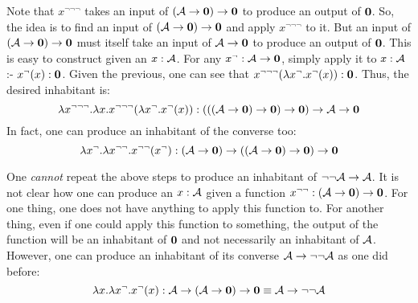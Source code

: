 Note that $x^{\neg\neg\neg}$ takes an input of $(\mathcal{A} \to \textbf{0}) \to \textbf{0}$ to produce an output of $\textbf{0}$. So, the idea is to find an input of $(\mathcal{A} \to \textbf{0}) \to \textbf{0}$ and apply $x^{\neg\neg\neg}$ to it. But an input of $(\mathcal{A} \to \textbf{0}) \to \textbf{0}$ must itself take an input of $\mathcal{A} \to \textbf{0}$ to produce an output of $\textbf{0}$. This is easy to construct given an $x : \mathcal{A}$. For any $x^{\neg} : \mathcal{A} \to \textbf{0}$, simply apply it to $x : \mathcal{A}$ :- $x^{\neg}(x) : \textbf{0}$.
Given the previous, one can see that $x^{\neg\neg\neg}(\lambda x^{\neg} . x^{\neg}(x)) : \textbf{0}$. Thus, the desired inhabitant is:
\[
	\lambda x^{\neg\neg\neg} . \lambda x . x^{\neg\neg\neg}(\lambda x^{\neg} . x^{\neg}(x)) : (((\mathcal{A} \to \textbf{0}) \to \textbf{0}) \to \textbf{0}) \to \mathcal{A} \to \textbf{0}
\]
In fact, one can produce an inhabitant of the converse too:
\[
	\lambda x^{\neg} . \lambda x^{\neg\neg} . x^{\neg\neg}(x^{\neg}) : (\mathcal{A} \to \textbf{0}) \to ((\mathcal{A} \to \textbf{0}) \to \textbf{0}) \to \textbf{0}
\]

 One \textit{cannot} repeat the above steps to produce an inhabitant of $\neg\neg \mathcal{A} \to \mathcal{A}$. It is not clear how one can produce an $x : \mathcal{A}$ given a function $x^{\neg\neg} : (\mathcal{A} \to \textbf{0}) \to \textbf{0}$. For one thing, one does not have anything to apply this function to. For another thing, even if one could apply this function to something, the output of the function will be an inhabitant of $\textbf{0}$ and not necessarily an inhabitant of $\mathcal{A}$. However, one can produce an inhabitant of its converse $\mathcal{A} \to \neg\neg \mathcal{A}$ as one did before:
\[
	\lambda x . \lambda x^{\neg} . x^{\neg}(x) : \mathcal{A} \to (\mathcal{A} \to \textbf{0}) \to \textbf{0} \equiv \mathcal{A} \to \neg\neg \mathcal{A}
\]



%
%
